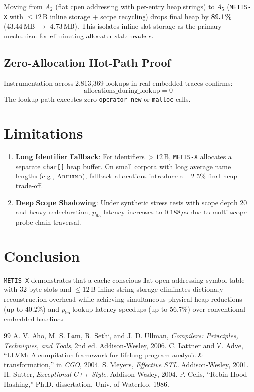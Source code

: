 \documentclass[conference]{IEEEtran}
\begin{document}
Moving from $A_2$ (flat open addressing with per-entry heap strings) to $A_5$ (\texttt{METIS-X} with $\le 12$\,B inline storage + scope recycling) drops final heap by \textbf{89.1\%} (43.44\,MB $\to$ 4.73\,MB). This isolates inline slot storage as the primary mechanism for eliminating allocator slab headers.

\subsection{Zero-Allocation Hot-Path Proof}
Instrumentation across 2,813,369 lookups in real embedded traces confirms:
\begin{equation}
\text{allocations\_during\_lookup} = 0
\end{equation}
The lookup path executes zero \texttt{operator new} or \texttt{malloc} calls.

\section{Limitations}
\begin{enumerate}
    \item \textbf{Long Identifier Fallback}: For identifiers $>12$\,B, \texttt{METIS-X} allocates a separate \texttt{char[]} heap buffer. On small corpora with long average name lengths (e.g., \textsc{Arduino}), fallback allocations introduce a +2.5\% final heap trade-off.
    \item \textbf{Deep Scope Shadowing}: Under synthetic stress tests with scope depth 20 and heavy redeclaration, $p_{95}$ latency increases to $0.188\,\mu\text{s}$ due to multi-scope probe chain traversal.
\end{enumerate}

\section{Conclusion}
\texttt{METIS-X} demonstrates that a cache-conscious flat open-addressing symbol table with 32-byte slots and $\le 12$\,B inline string storage eliminates dictionary reconstruction overhead while achieving simultaneous physical heap reductions (up to 40.2\%) and $p_{95}$ lookup latency speedups (up to 56.7\%) over conventional embedded baselines.

\begin{thebibliography}{99}
 A. V. Aho, M. S. Lam, R. Sethi, and J. D. Ullman, \emph{Compilers: Principles, Techniques, and Tools}, 2nd ed. Addison-Wesley, 2006.
 C. Lattner and V. Adve, ``LLVM: A compilation framework for lifelong program analysis \& transformation,'' in \emph{CGO}, 2004.
 S. Meyers, \emph{Effective STL}. Addison-Wesley, 2001.
 H. Sutter, \emph{Exceptional C++ Style}. Addison-Wesley, 2004.
 P. Celis, ``Robin Hood Hashing,'' Ph.D. dissertation, Univ. of Waterloo, 1986.
\end{thebibliography}
\end{document}
